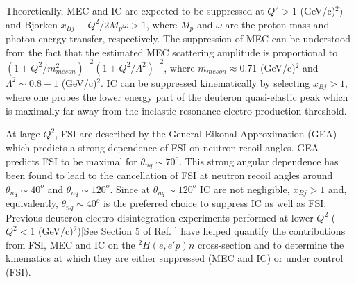 Theoretically, MEC and IC are expected to be suppressed at $Q^{2}>1$ (GeV/c)$^{2})$ and Bjorken $x_{Bj}\equiv Q^{2}/2M_{p}\omega>1$, where $M_{p}$ and $\omega$ are the proton mass and photon energy transfer, respectively.
The suppression of MEC can be understood from the fact that the estimated MEC scattering amplitude is proportional to  $(1 + Q^{2}/m^{2}_{meson})^{-2}(1+Q^{2}/\Lambda^{2})^{-2}$, where $m_{meson}\approx0.71$ (GeV/c)$^{2}$ and
$\Lambda^{2}\sim 0.8-1 $ (GeV/c)$^{2}$\cite{Sargsian_2001}. IC can be suppressed kinematically by selecting $x_{Bj}>1$, where one probes the lower energy part of the deuteron quasi-elastic peak which is maximally far away from the inelastic resonance
electro-production threshold.

At large $Q^{2}$, FSI are described by the General Eikonal Approximation (GEA)\cite{Sargsian_2001,PhysRevC.56.1124,sargsian_2015} which predicts a strong dependence of FSI on neutron recoil angles. GEA predicts FSI to be maximal for $\theta_{nq}\sim70^{o}$. 
This strong angular dependence has been found to lead to the cancellation of FSI at neutron recoil angles around $\theta_{nq}\sim40^{o}$ and $\theta_{nq}\sim120^{o}$. Since at $\theta_{nq}\sim120^{o}$ IC are not negligible, $x_{Bj}>1$ and, equivalently,  $\theta_{nq}\sim40^{o}$ is the preferred choice to suppress IC as well as FSI. \\
\indent Previous deuteron electro-disintegration experiments performed at lower $Q^{2}$ ($Q^{2}<1$ (GeV/c)$^{2}$)[See Section 5 of Ref. \cite{sargsian_2015}] have helped quantify the contributions from FSI, MEC and IC on
the $^{2}H(e,e'p)n$ cross-section and to determine the kinematics at which they are either suppressed (MEC and IC) or under control (FSI).  


